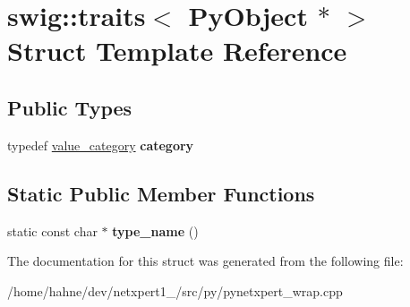 \hypertarget{structswig_1_1traits_3_01PyObject_01_5_01_4}{}\section{swig\+:\+:traits$<$ Py\+Object $\ast$ $>$ Struct Template Reference}
\label{structswig_1_1traits_3_01PyObject_01_5_01_4}
\subsection*{Public Types}
\begin{DoxyCompactItemize}
\item 
typedef \hyperlink{structswig_1_1value__category}{value\+\_\+category} {\bfseries category}\hypertarget{structswig_1_1traits_3_01PyObject_01_5_01_4_a61e2b13476996b055b368fe035b84efc}{}\label{structswig_1_1traits_3_01PyObject_01_5_01_4_a61e2b13476996b055b368fe035b84efc}

\end{DoxyCompactItemize}
\subsection*{Static Public Member Functions}
\begin{DoxyCompactItemize}
\item 
static const char $\ast$ {\bfseries type\+\_\+name} ()\hypertarget{structswig_1_1traits_3_01PyObject_01_5_01_4_a0d02bab40318920cce95270a10e465cd}{}\label{structswig_1_1traits_3_01PyObject_01_5_01_4_a0d02bab40318920cce95270a10e465cd}

\end{DoxyCompactItemize}


The documentation for this struct was generated from the following file\+:\begin{DoxyCompactItemize}
\item 
/home/hahne/dev/netxpert1\+\_/src/py/pynetxpert\+\_\+wrap.\+cpp\end{DoxyCompactItemize}
